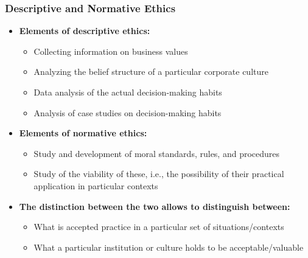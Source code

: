 \documentclass[aspectratio=169, 10pt]{beamer}
\begin{document}
\begin{frame}
\frametitle{\textbf{Descriptive and Normative Ethics}}

\begin{itemize}
  \item \textcolor{WHUblue}{\textbf{Elements of descriptive ethics:}}
  \begin{itemize}
    \item Collecting information on business values
    \item Analyzing the belief structure of a particular corporate culture
    \item Data analysis of the actual decision-making habits
    \item Analysis of case studies on decision-making habits
  \end{itemize}

  \vspace{0.5em}

  \item \textcolor{WHUblue}{\textbf{Elements of normative ethics:}}
  \begin{itemize}
    \item Study and development of moral standards, rules, and procedures
    \item Study of the viability of these, i.e., the possibility of their practical application in particular contexts
  \end{itemize}

  \vspace{0.5em}

  \item \textcolor{WHUblue}{\textbf{The distinction between the two allows to distinguish between:}}
  \begin{itemize}
    \item What is accepted practice in a particular set of situations/contexts
    \item What a particular institution or culture holds to be acceptable/valuable
  \end{itemize}
\end{itemize}

\end{frame}
\end{document}
